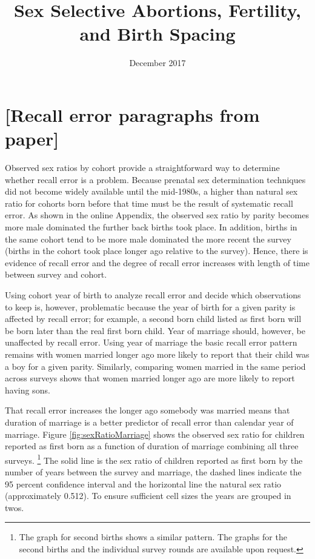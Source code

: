 \documentclass[12pt,letterpaper]{article}
\title{Sex Selective Abortions, Fertility, and Birth Spacing
}
\author{}
\date{December 2017}
\begin{document}
\graphicspath{{../figures/}}
\doublespacing

\appendix

\renewcommand\thefigure{\thesection.\arabic{figure}}    

\renewcommand\thetable{\thesection.\arabic{table}}    
\setcounter{table}{0}

\section{[Recall error paragraphs from paper]}

Observed sex ratios by cohort provide a straightforward way to determine 
whether recall error is a problem.
Because prenatal sex determination techniques did not become widely available until the 
mid-1980s, a higher than natural sex ratio for cohorts born before that time must be 
the result of systematic recall error.
As shown in the online Appendix, the observed sex ratio by parity becomes more male 
dominated the further back births took place.
In addition, births in the same cohort tend to be more male dominated the more recent the 
survey (births in the cohort took place longer ago relative to the survey).
Hence, there is evidence of recall error and the degree of recall error increases
with length of time between survey and cohort.

Using cohort year of birth to analyze recall error and decide which observations
to keep is, however, problematic because the year of birth for a given parity is affected 
by recall error; for example, a second born child listed as first born will be 
born later than the real first born child.
Year of marriage should, however, be unaffected by recall error.
Using year of marriage the basic recall error pattern remains with women married longer 
ago more likely to report that their child was a boy for a given parity.
Similarly, comparing women married in the same period across surveys shows
that women married longer ago are more likely to report having sons.

That recall error increases the longer ago somebody was married means
that duration of marriage is a better predictor of recall error than calendar year of 
marriage.
Figure \ref{fig:sexRatioMarriage} shows the observed sex ratio for children 
reported as first born as a function of duration of marriage combining all three surveys.%
\footnote{
The graph for second births shows a similar pattern.
The graphs for the second births and the individual survey rounds are available upon request.
}
The solid line is the sex ratio of children reported 
as first born by the number of years between the survey and marriage, 
the dashed lines indicate the 95 percent confidence interval 
and the horizontal line the natural sex ratio (approximately 0.512).
To ensure sufficient cell sizes the years are grouped in twos.
\end{document}
